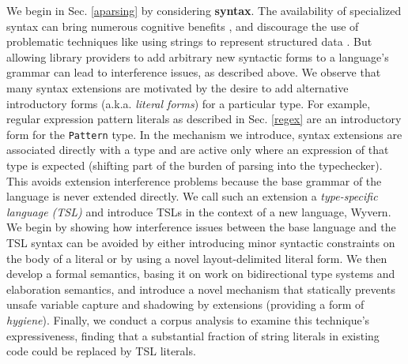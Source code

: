 We begin in Sec. \ref{aparsing} by considering \textbf{syntax}. The availability of specialized syntax can bring numerous cognitive benefits \cite{green1996usability}, and discourage the use of problematic techniques like using strings to represent structured data \cite{Bravenboer:2007:PIA:1289971.1289975}. But allowing library providers to add arbitrary new syntactic forms to a language's grammar can lead to interference issues, as described above. We observe that many syntax extensions are motivated by the desire to add alternative  introductory forms (a.k.a. \emph{literal forms}) for a particular type. For example, regular expression pattern literals as described in Sec. \ref{regex} are an introductory form for the \verb|Pattern| type.  In the mechanism we introduce, syntax extensions are associated directly with a type and are active only where an expression of that type is expected (shifting part of the burden of parsing into the typechecker). This avoids extension interference problems because the base grammar of the language is never extended directly. We call such an extension a \emph{type-specific language (TSL)} and introduce TSLs in the context of a new language, Wyvern. We begin by showing how interference issues between the base language and the TSL syntax can be avoided by either introducing minor syntactic constraints on the body of a literal or by using a novel layout-delimited literal form. We then develop a formal semantics, basing it on work on bidirectional type systems and elaboration semantics, and introduce a novel mechanism that statically prevents unsafe variable capture and shadowing by extensions (providing a form of \emph{hygiene}). Finally, we conduct a corpus analysis to examine this technique's expressiveness, finding that a substantial fraction of string literals in existing code could be replaced by TSL literals.

